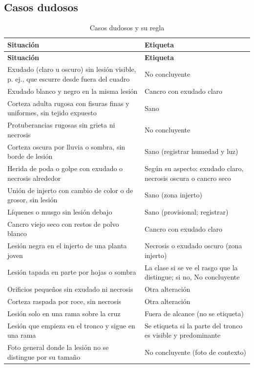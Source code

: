 \documentclass[11pt]{article}
\begin{document}
\subsection{Casos dudosos}
{\small
\begin{longtable}{|>{\RaggedRight\arraybackslash}p{9.97cm}|>{\RaggedRight\arraybackslash}p{4.89cm}|}
\caption{Casos dudosos y su regla}\\
\hline
\rowcolor{encabezado}\textbf{Situación} & \textbf{Etiqueta} \\ \hline
\endfirsthead
\hline
\rowcolor{encabezado}\textbf{Situación} & \textbf{Etiqueta} \\ \hline
\endhead
Exudado (claro u oscuro) sin lesión visible, p. ej., que escurre desde fuera del cuadro & No concluyente \\ \hline
Exudado blanco y negro en la misma lesión & Cancro con exudado claro \\ \hline
Corteza adulta rugosa con fisuras finas y uniformes, sin tejido expuesto & Sano \\ \hline
Protuberancias rugosas sin grieta ni necrosis & No concluyente \\ \hline
Corteza oscura por lluvia o sombra, sin borde de lesión & Sano (registrar humedad y luz) \\ \hline
Herida de poda o golpe con exudado o necrosis alrededor & Según su aspecto: exudado claro, necrosis oscura o cancro seco \\ \hline
Unión de injerto con cambio de color o de grosor, sin lesión & Sano (zona injerto) \\ \hline
Líquenes o musgo sin lesión debajo & Sano (provisional; registrar) \\ \hline
Cancro viejo seco con restos de polvo blanco & Cancro con exudado claro \\ \hline
Lesión negra en el injerto de una planta joven & Necrosis o exudado oscuro (zona injerto) \\ \hline
Lesión tapada en parte por hojas o sombra & La clase si se ve el rasgo que la distingue; si no, No concluyente \\ \hline
Orificios pequeños sin exudado ni necrosis & Otra alteración \\ \hline
Corteza raspada por roce, sin necrosis & Otra alteración \\ \hline
Lesión solo en una rama sobre la cruz & Fuera de alcance (no se etiqueta) \\ \hline
Lesión que empieza en el tronco y sigue en una rama & Se etiqueta si la parte del tronco es visible y predominante \\ \hline
Foto general donde la lesión no se distingue por su tamaño & No concluyente (foto de contexto) \\ \hline
\end{longtable}}
\end{document}
